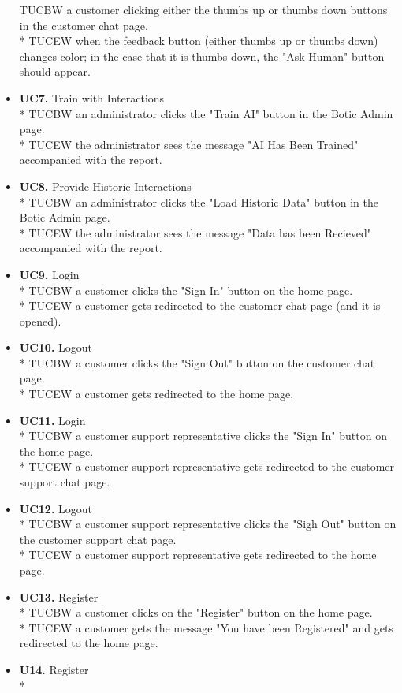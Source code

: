 \documentclass[11pt]{article}
\begin{document}
\begin{itemize}
	TUCBW a customer clicking either the thumbs up or thumbs down buttons in the customer chat page.\\*
	TUCEW when the feedback button (either thumbs up or thumbs down) changes color; in the case that it is thumbs down, the "Ask Human" button should appear.
	\item[] \textbf{UC7.} Train with Interactions\\*
	TUCBW an administrator clicks the "Train AI" button in the Botic Admin page.\\*
	TUCEW the administrator sees the message "AI Has Been Trained" accompanied with the report.
	\item[] \textbf{UC8.} Provide Historic Interactions\\*
	TUCBW an administrator clicks the "Load Historic Data" button in the Botic Admin page.\\*
	TUCEW the administrator sees the message "Data has been Recieved" accompanied with the report.
	\item[] \textbf{UC9.} Login\\*
	TUCBW a customer clicks the "Sign In" button on the home page. \\*
	TUCEW a customer gets redirected to the customer chat page (and it is opened).
	\item[] \textbf{UC10.} Logout\\*
	TUCBW a customer clicks the "Sign Out" button on the customer chat page.\\*
	TUCEW a customer gets redirected to the home page.
	\item[] \textbf{UC11.} Login\\*
	TUCBW a customer support representative clicks the "Sign In" button on the home page. \\*
	TUCEW a customer support representative gets redirected to the customer support chat page.
	\item[] \textbf{UC12.} Logout\\*
	TUCBW a customer support representative clicks the "Sigh Out" button on the customer support chat page.\\*
	TUCEW a customer support representative gets redirected to the home page.
	\item[] \textbf{UC13.} Register\\*
	TUCBW a customer clicks on the "Register" button on the home page. \\*
	TUCEW a customer gets the message "You have been Registered" and gets redirected to the home page.
	\item[] \textbf{U14.} Register\\*

\end{itemize}
\end{document}
